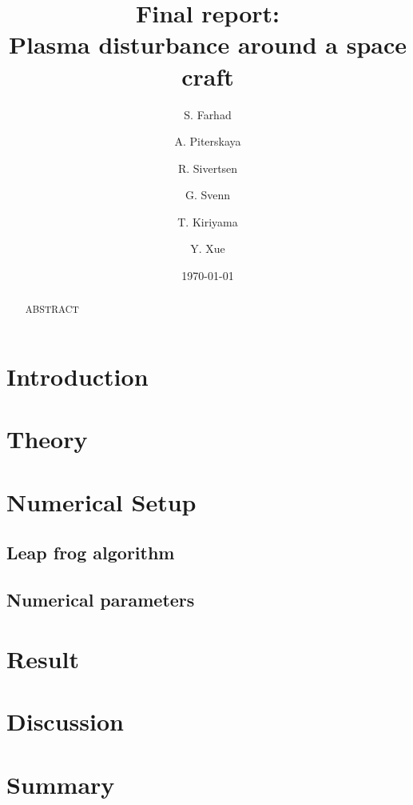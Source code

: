 \documentclass[%
 aip,
rsi,%
 amsmath,amssymb,
 reprint,%
]{revtex4-1}
\begin{document}
\title[4th 4DSpace Workshop -- Team Godzilla]{Final report:\\Plasma disturbance around a space craft}

\author{S. Farhad} 
\author{A. Piterskaya}
\author{R. Sivertsen}
\author{G. Svenn}

\author{T. Kiriyama}
\author{Y. Xue}

\date{\today}

\begin{abstract}
ABSTRACT
\end{abstract}

\maketitle

\section{\label{sec:intro} Introduction}

\section{\label{sec:theory} Theory}

\section{\label{sec:numsetup} Numerical Setup}

\subsection{Leap frog algorithm}

\subsection{Numerical parameters}

\section{Result}

\section{Discussion}

\section{Summary}

\nocite{*}
\end{document}
